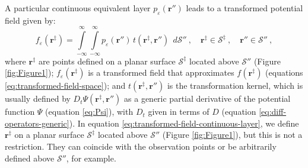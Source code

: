 A particular continuous equivalent layer 
$p_{\varepsilon}(\mathbf{r}'')$ leads to a transformed potential field given by:
\begin{equation}
	f_{\varepsilon}(\mathbf{r}^{\ddagger})
	= \int\limits_{-\infty}^{\infty}\int\limits_{-\infty}^{\infty}
	p_{\varepsilon}(\mathbf{r}'') \, t(\mathbf{r}^{\ddagger}, \mathbf{r}'') \:\: d\mathcal{S}'' \: , 
	\quad \mathbf{r}^{\ddagger} \in \mathcal{S}^{\ddagger} \: ,
	\quad \mathbf{r}'' \in \mathcal{S}'' \: ,
	\label{eq:transformed-field-continuous-layer}
\end{equation}
where $\mathbf{r}^{\ddagger}$ are points defined on a planar surface $\mathcal{S}^{\ddagger}$ located above $\mathcal{S}''$ (Figure \ref{fig:Figure1}); 
$f_{\varepsilon}(\mathbf{r}^{\ddagger})$ is a transformed field that approximates 
$f(\mathbf{r}^{\ddagger})$ (equations \ref{eq:transformed-field-space}); and
$t(\mathbf{r}^{\ddagger}, \mathbf{r}'')$ is the transformation kernel,
which is usually defined by $D_{t} \Psi(\mathbf{r}^{\ddagger}, \mathbf{r}'')$ as a generic partial 
derivative of the potential function $\Psi$
(equation \ref{eq:Psi}), with $D_{t}$ given in terms of $D$ (equation \ref{eq:diff-operators-generic}).
In equation \ref{eq:transformed-field-continuous-layer}, we define $\mathbf{r}^{\ddagger}$ on 
a planar surface $\mathcal{S}^{\ddagger}$ located above $\mathcal{S}''$ (Figure \ref{fig:Figure1}), but this is not a 
restriction. They can coincide with the observation points or be arbitrarily defined above $\mathcal{S}''$, for example.
